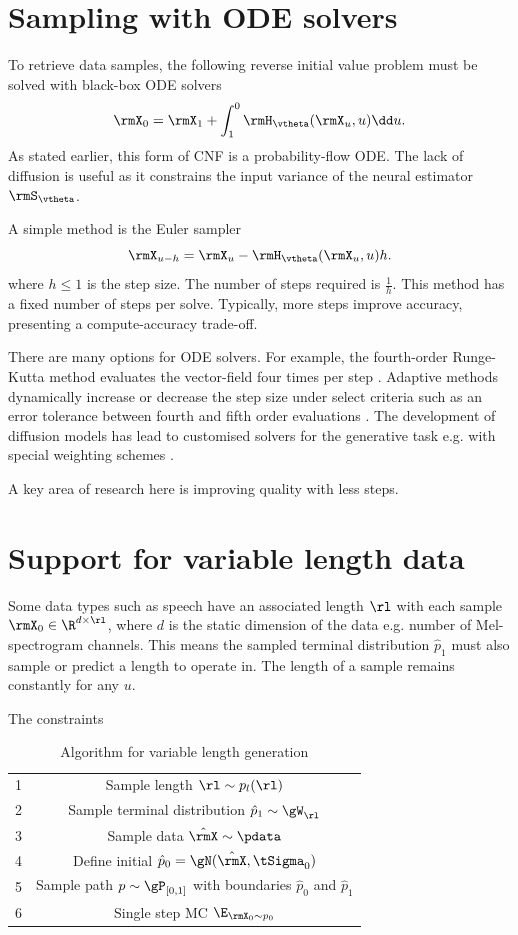 
\section{Sampling with ODE solvers}
To retrieve data samples, the following reverse initial value problem must be solved with black-box ODE solvers
\[
\rmX_0=\rmX_1 + \int_1^0\rmH_\vtheta(\rmX_u,u)\dd u.
\]
As stated earlier, this form of CNF is a probability-flow ODE. The lack of diffusion is useful as it constrains the input variance of the neural estimator $\rmS_\vtheta$.  

A simple method is the Euler sampler
\[
\rmX_{u-h}=\rmX_u -\rmH_\vtheta(\rmX_u,u)h.
\]
where $h\leq 1$ is the step size. The number of steps required is $\frac{1}{h}$. This method has a fixed number of steps per solve. Typically, more steps improve accuracy, presenting a compute-accuracy trade-off. 

There are many options for ODE solvers. For example, the fourth-order Runge-Kutta method evaluates the vector-field four times per step \citep{Runge1895UeberDN,kutta1901beitrag}. Adaptive methods dynamically increase or decrease the step size under select criteria such as an error tolerance between fourth and fifth order evaluations \citep{dormandFamilyEmbeddedRungeKutta1980}. The development of diffusion models has lead to customised solvers for the generative task e.g. with special weighting schemes \citep{cheng2022dpmsolvr}.

A key area of research here is improving quality with less steps.

\section{Support for variable length data}
Some data types such as speech have an associated length $\rl$ with each sample $\rmX_0\in\R^{d\times\rl}$, where $d$ is the static dimension of the data e.g. number of Mel-spectrogram channels. This means the sampled terminal distribution $\hat p_1$ must also sample or predict a length to operate in. The length of a sample remains constantly for any $u$.

The constraints 
\begin{table}[]
    \centering
    \begin{tabular}{c|c}
        1 & Sample length $\rl\sim p_l(\rl)$ \\
        2 & Sample terminal distribution $\hat p_1\sim\gW_\rl$ \\
        3 & Sample data $\hat\rmX\sim \pdata$ \\
        4 & Define initial $\hat p_0 = \gN(\hat\rmX,\tSigma_0)$ \\
        5 & Sample path $p\sim\gP_{[0,1]}$ with boundaries $\hat p_0$ and $\hat p_1$ \\
        6 & Single step MC $\E_{\rmX_0\sim p_0}$
    \end{tabular}
    \caption{Algorithm for variable length generation}
    \label{tab:placeholder}
\end{table}

